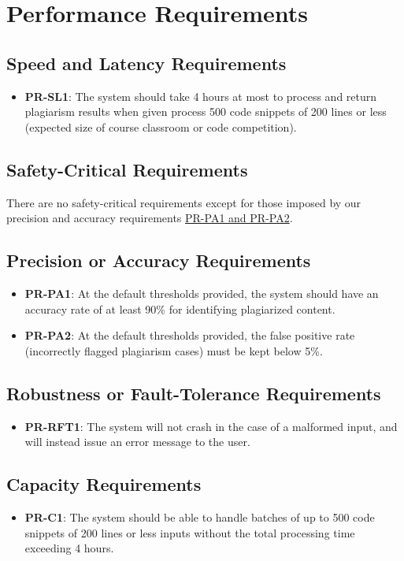 \documentclass[12pt]{article}
\begin{document}
\section{Performance Requirements}
\subsection{Speed and Latency Requirements}
\begin{itemize}
    \item \textbf{PR-SL1}: The system should take 4 hours at most to process 
    and return plagiarism results when given process 500 code snippets of 200 
    lines or less (expected size of course classroom or code competition).
\end{itemize}
\subsection{Safety-Critical Requirements}
There are no safety-critical requirements except for those imposed by our 
precision and accuracy requirements \hyperlink{subsection.12.3}{PR-PA1 and PR-PA2}.
\subsection{Precision or Accuracy Requirements}
\begin{itemize}
    \item \textbf{PR-PA1}: At the default thresholds provided, the system should 
    have an accuracy rate of at least 90\% for identifying plagiarized content.
    \item \textbf{PR-PA2}: At the default thresholds provided, the false positive 
    rate (incorrectly flagged plagiarism cases) must be kept below 5\%.
\end{itemize}
\subsection{Robustness or Fault-Tolerance Requirements}
\begin{itemize}
    \item \textbf{PR-RFT1}: The system will not crash in the case of a malformed input, and will instead issue an error message to the user.
\end{itemize}
\subsection{Capacity Requirements}
\begin{itemize}
    \item \textbf{PR-C1}: The system should be able to handle batches of up to 500 code snippets of 200 lines or less inputs without the total processing time exceeding 4 hours.
\end{itemize}
\end{document}
